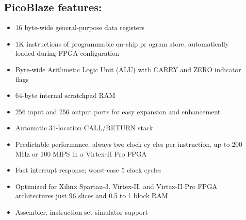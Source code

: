                 \subsection{PicoBlaze features:}
                        \begin{itemize}
                                \item 16 byte-wide general-purpose data registers
                                \item 1K instructions of programmable on-chip pr
                                        ogram store, automatically loaded during
                                        FPGA configuration
                                \item Byte-wide Arithmetic Logic Unit (ALU) with CARRY and ZERO indicator flags
                                \item 64-byte internal scratchpad RAM
                                \item 256 input and 256 output ports for easy expansion and enhancement
                                \item Automatic 31-location CALL/RETURN stack
                                \item Predictable performance, always two clock cy
                                        cles per instruction, up to 200 MHz or
                                        100 MIPS in a Virtex-II Pro FPGA
                                \item Fast interrupt response; worst-case 5 clock cycles
                                \item Optimized for Xilinx Spartan-3, Virtex-II, and Virtex-II Pro FPGA architectures just
                                        96 slices and 0.5 to 1 block RAM
                                \item Assembler, instruction-set simulator support
                        \end{itemize}
